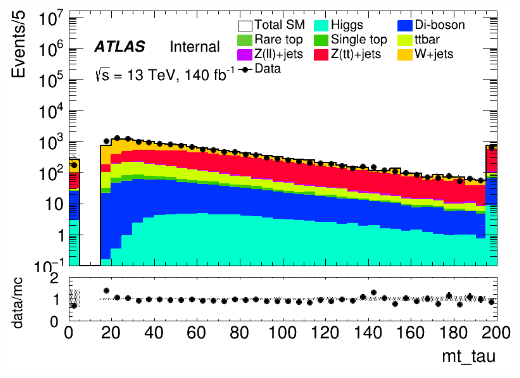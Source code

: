 \documentclass[usenames,dvipsnames]{beamer}
\begin{document}
\begin{frame}
\begin{minipage}{0.32\textwidth}
        \includegraphics[width=\textwidth]{graphics/HH_met/HH_met_mt_tau.png}
    \end{minipage}
    
    \vspace{0.5cm} %


\end{frame}
\end{document}
